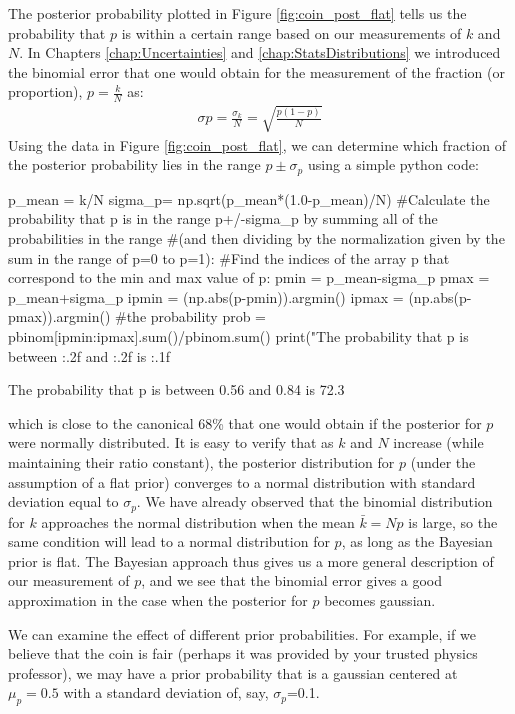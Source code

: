 The posterior probability plotted in Figure \ref{fig:coin_post_flat} tells us the probability that $p$ is within a certain range based on our measurements of $k$ and $N$. In Chapters \ref{chap:Uncertainties} and \ref{chap:StatsDistributions} we introduced the binomial error that one would obtain for the measurement of the fraction (or proportion), $p=\frac{k}{N}$ as:
\begin{align*}
\sigma p = \frac{\sigma_k}{N}=\sqrt{\frac{p(1-p)}{N}}
\end{align*}
Using the data in Figure \ref{fig:coin_post_flat}, we can determine which fraction of the posterior probability lies in the range $p\pm\sigma_p$ using a simple python code:
\begin{python}[caption = Coverage of the binomial error on a ratio]
p_mean = k/N
sigma_p= np.sqrt(p_mean*(1.0-p_mean)/N)
#Calculate the probability that p is in the range p+/-sigma_p by summing all of the probabilities in the range
#(and then dividing by the normalization given by the sum in the range of p=0 to p=1):
#Find the indices of the array p that correspond to the min and max value of p:
pmin = p_mean-sigma_p
pmax = p_mean+sigma_p
ipmin = (np.abs(p-pmin)).argmin()
ipmax = (np.abs(p-pmax)).argmin()
#the probability
prob = pbinom[ipmin:ipmax].sum()/pbinom.sum()
print("The probability that p is between {:.2f} and {:.2f} is {:.1f}%
\end{python}
\begin{poutput}
The probability that p is between 0.56 and 0.84 is 72.3%
\end{poutput}
which is close to the canonical 68\% that one would obtain if the posterior for $p$ were normally distributed. It is easy to verify that as $k$ and $N$ increase (while maintaining their ratio constant), the posterior distribution for $p$ (under the assumption of a flat prior) converges to a normal distribution with standard deviation equal to $\sigma_p$. We have already observed that the binomial distribution for $k$ approaches the normal distribution when the mean $\bar k=Np$ is large, so the same condition will lead to a normal distribution for $p$, as long as the Bayesian prior is flat. The Bayesian approach thus gives us a more general description of our measurement of $p$, and we see that the binomial error gives a good approximation in the case when the posterior for $p$ becomes gaussian.

We can examine the effect of different prior probabilities. For example, if we believe that the coin is fair (perhaps it was provided by your trusted physics professor), we may have a prior probability that is a gaussian centered at $\mu_p=0.5$ with a standard deviation of, say, $\sigma_p$=0.1.

